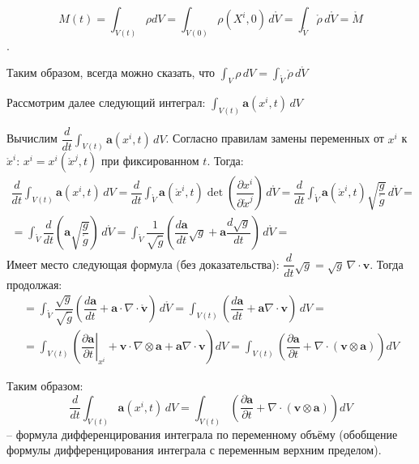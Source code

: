 \[
  M(t) = \int_{V(t)} \rho dV
  = \int_{V(0)} \rho(X^i, 0) \, d\mathring{V}
  = \int_{\mathring{V}} \mathring{\rho} \, d\mathring{V}
  = \mathring{M}
\]
.

Таким образом, всегда можно сказать, что $\int_V \rho \, dV = \int_\mathring{V} \mathring{\rho} \, d\mathring{V}$

Рассмотрим далее следующий интеграл: $\int_{V(t)} \mathbf{a} (x^i, t) \, dV$

Вычислим $\dfrac{d}{dt} \int_{V(t)} \mathbf{a}(x^i, t) \, dV$. Согласно правилам
замены переменных от $x^i$ к $\mathring{x}^i$: $x^i = x^i(\mathring{x}^j, t)$
при фиксированном $t$. Тогда:
\begin{multline*}
  \dfrac{d}{dt} \int_{V(t)} \mathbf{a}(x^i, t) \, dV
  = \dfrac{d}{dt} \int_{\mathring{V}} \mathbf{a}(\mathring{x}^i, t) \det \left( \dfrac{\partial x^i}{\partial \mathring{x}^j}  \right) \, d\mathring{V}
  = \dfrac{d}{dt} \int_{\mathring{V}} \mathbf{a}(\mathring{x}^i, t) \sqrt{\dfrac{g}{\mathring{g}}} \, d\mathring{V} = \\
  = \int_{\mathring{V}} \dfrac{d}{dt} \left( \mathbf{a} \sqrt{\dfrac{g}{\mathring{g}}} \right) \, d\mathring{V}
  = \int_{\mathring{V}} \dfrac{1}{\sqrt{\mathring{g}}} \left( \dfrac{d\mathbf{a}}{dt}\sqrt{g} + \mathbf{a} \dfrac{d\sqrt{g}}{dt} \right) \, d\mathring{V} = 
\end{multline*}
Имеет место следующая формула (без доказательства): $\dfrac{d}{dt}\sqrt{g} = \sqrt{g} \, \nabla \cdot \mathbf{v}$.
Тогда продолжая:
\begin{multline*}
  = \int_{\mathring{V}} \dfrac{\sqrt{g}}{\sqrt{\mathring{g}}} \left( \dfrac{d\mathbf{a}}{dt} + \mathbf{a} \cdot \nabla \cdot \mathbf{\mathring{v}} \right) \, d\mathring{V}
  = \int_{V(t)} \left( \dfrac{d \mathbf{a}}{dt} + \mathbf{a} \nabla \cdot \mathbf{v} \right) \, dV = \\
  = \int_{V(t)} \left( \left. \dfrac{\partial \mathbf{a}}{\partial t} \right|_{x^i} 
    + \mathbf{v} \cdot \nabla \otimes \mathbf{a} + \mathbf{a} \nabla \cdot \mathbf{v}\right) dV
  = \int_{V(t)} \left( \dfrac{\partial \mathbf{a}}{\partial t} + \nabla \cdot \left( \mathbf{v} \otimes \mathbf{a} \right)  \right) dV
\end{multline*}

Таким образом:
\[
  \dfrac{d}{dt} \int_{V(t)} \mathbf{a}(x^i, t) \, dV
  = \int_{V(t)} \left( \dfrac{\partial \mathbf{a}}{\partial t} + \nabla \cdot \left( \mathbf{v} \otimes \mathbf{a} \right)  \right) dV
\]
-- формула дифференцирования интеграла по переменному объёму (обобщение формулы
дифференцирования интеграла с переменным верхним пределом).



